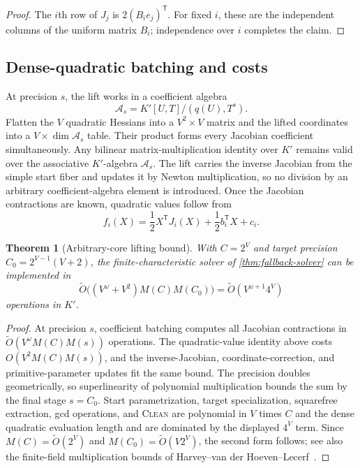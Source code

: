 \documentclass[10pt,a4paper]{article}
\newtheorem{theorem}{Theorem}[section]
\newcommand{\trans}{\mathsf T}
\begin{document}
\begin{proof}
The $i$th row of $J_j$ is $2(B_ie_j)^{\trans}$. For fixed $i$, these are the independent columns of the uniform matrix $B_i$; independence over $i$ completes the claim.
\end{proof}

\subsection{Dense-quadratic batching and costs}

At precision $s$, the lift works in a coefficient algebra
\[
\mathcal A_s=K'[U,T]/(q(U),T^s).
\]
Flatten the $V$ quadratic Hessians into a $V^2\times V$ matrix and the lifted coordinates into a $V\times\dim\mathcal A_s$ table.  Their product forms every Jacobian coefficient simultaneously.  Any bilinear matrix-multiplication identity over $K'$ remains valid over the associative $K'$-algebra $\mathcal A_s$.  The lift carries the inverse Jacobian from the simple start fiber and updates it by Newton multiplication, so no division by an arbitrary coefficient-algebra element is introduced.  Once the Jacobian contractions are known, quadratic values follow from
\[
f_i(X)=\frac12X^{\trans}J_i(X)+\frac12b_i^{\trans}X+c_i.
\]

\begin{theorem}[Arbitrary-core lifting bound]\label{thm:fallback-cost}
With $C=2^V$ and target precision $C_0=2^{V-1}(V+2)$, the finite-characteristic solver of \cref{thm:fallback-solver} can be implemented in
\[
\widetilde O\bigl((V^\omega+V^2)M(C)M(C_0)\bigr)
=\widetilde O(V^{\omega+1}4^V)
\]
operations in $K'$.
\end{theorem}

\begin{proof}
At precision $s$, coefficient batching computes all Jacobian contractions in $\widetilde O(V^\omega M(C)M(s))$ operations.  The quadratic-value identity above costs $O(V^2M(C)M(s))$, and the inverse-Jacobian, coordinate-correction, and primitive-parameter updates fit the same bound.  The precision doubles geometrically, so superlinearity of polynomial multiplication bounds the sum by the final stage $s=C_0$.  Start parametrization, target specialization, squarefree extraction, gcd operations, and \textsc{Clean} are polynomial in $V$ times $C$ and the dense quadratic evaluation length and are dominated by the displayed $4^V$ term.  Since $M(C)=\widetilde O(2^V)$ and $M(C_0)=\widetilde O(V2^V)$, the second form follows; see also the finite-field multiplication bounds of Harvey--van der Hoeven--Lecerf~\cite{Harvey}.
\end{proof}
\end{document}
